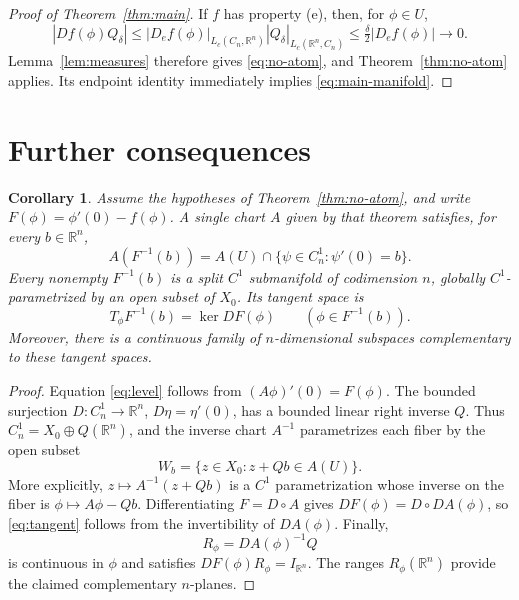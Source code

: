 \documentclass[11pt]{article}
\newtheorem{corollary}[theorem]{Corollary}
\newcommand{\Lc}{L_c}
\begin{document}
\begin{proof}[Proof of Theorem~\ref{thm:main}]
If $f$ has property \textup{(e)}, then, for $\phi\in U$,
\[
 |Df(\phi)Q_\delta|
 \le|D_ef(\phi)|_{\Lc(C_n,\mathbb R^n)}
      |Q_\delta|_{\Lc(\mathbb R^n,C_n)}
 \le\tfrac{\delta}{2}|D_ef(\phi)|\longrightarrow0.
\]
Lemma~\ref{lem:measures} therefore gives \eqref{eq:no-atom}, and Theorem~\ref{thm:no-atom} applies. Its endpoint identity immediately implies \eqref{eq:main-manifold}.
\end{proof}

\section{Further consequences}

\begin{corollary}\label{cor:levels}
Assume the hypotheses of Theorem~\ref{thm:no-atom}, and write
$F(\phi)=\phi'(0)-f(\phi)$. A single chart $A$ given by that theorem satisfies, for every $b\in\mathbb R^n$,
\begin{equation}\label{eq:level}
 A(F^{-1}(b))=A(U)\cap\{\psi\in C_n^1:\psi'(0)=b\}.
\end{equation}
Every nonempty $F^{-1}(b)$ is a split $C^1$ submanifold of codimension $n$, globally $C^1$-parametrized by an open subset of $X_0$. Its tangent space is
\begin{equation}\label{eq:tangent}
 T_\phi F^{-1}(b)=\ker DF(\phi)\qquad(\phi\in F^{-1}(b)).
\end{equation}
Moreover, there is a continuous family of $n$-dimensional subspaces complementary to these tangent spaces.
\end{corollary}
\begin{proof}
Equation \eqref{eq:level} follows from
$(A\phi)'(0)=F(\phi)$. The bounded surjection
$D:C_n^1\to\mathbb R^n$, $D\eta=\eta'(0)$, has a bounded linear right inverse $Q$. Thus
$C_n^1=X_0\oplus Q(\mathbb R^n)$, and the inverse chart $A^{-1}$ parametrizes each fiber by the open subset
\[
 W_b=\{z\in X_0:z+Qb\in A(U)\}.
\]
More explicitly, $z\mapsto A^{-1}(z+Qb)$ is a $C^1$ parametrization whose inverse on the fiber is $\phi\mapsto A\phi-Qb$. Differentiating $F=D\circ A$ gives $DF(\phi)=D\circ DA(\phi)$, so \eqref{eq:tangent} follows from the invertibility of $DA(\phi)$. Finally,
\[
 R_\phi=DA(\phi)^{-1}Q
\]
is continuous in $\phi$ and satisfies $DF(\phi)R_\phi=I_{\mathbb R^n}$. The ranges $R_\phi(\mathbb R^n)$ provide the claimed complementary $n$-planes.
\end{proof}
\end{document}
